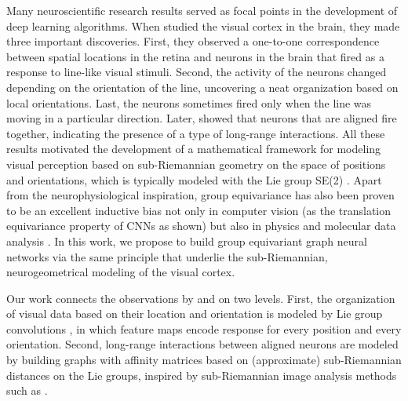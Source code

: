 \documentclass{article}
\begin{document}
Many neuroscientific research results served as focal points in the development of deep learning algorithms. When \citet{hubel1962receptive} studied the visual cortex in the brain, they made three important discoveries. First, they observed a one-to-one correspondence between spatial locations in the retina and neurons in the brain that fired as a response to line-like visual stimuli. Second, the activity of the neurons changed depending on the orientation of the line, uncovering a neat organization based on local orientations. Last, the neurons sometimes fired only when the line was moving in a particular direction. Later, \citet{bosking_orientation_1997} showed that neurons that are aligned fire together, indicating the presence of a type of long-range interactions. All these results motivated the development of a mathematical framework for modeling visual perception based on sub-Riemannian geometry on the space of positions and orientations, which is typically modeled with the Lie group SE(2) \citep{petitot_neurogeometry_2003,citti_cortical_2006,duits_association_2014}. Apart from the neurophysiological inspiration, group equivariance has also been proven to be an excellent inductive bias \citep{cohen2016gcnn} not only in computer vision (as the translation equivariance property of CNNs as shown) but also in physics \citep{finzi2020generalizing} and molecular data analysis \citep{fuchs2021iterative,
jumper2020high}. In this work, we propose to build group equivariant graph neural networks via the same principle that underlie the sub-Riemannian, neurogeometrical modeling of the visual cortex.

Our work connects the observations by \cite{hubel1962receptive} and \cite{bosking_orientation_1997} on two levels. First, the organization of visual data based on their location and orientation \citep{hubel1962receptive} is modeled by Lie group convolutions \citep{bekkers2019b}, in which feature maps encode response for every position and every orientation. Second, long-range interactions between aligned neurons \citep{bosking_orientation_1997} are modeled by building graphs with affinity matrices based on (approximate) sub-Riemannian distances on the Lie groups, inspired by sub-Riemannian image analysis methods such as \citep{franken_crossing-preserving_2009,bekkers_pde_2015,favali_analysis_2016,mashtakov2017tracking,boscain2018highly,duits_optimal_2018,baspinar2021cortical}. 
\end{document}
